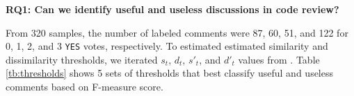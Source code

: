 %
%
%
%
%
%
%


\noindent \textbf{RQ1: Can we identify useful and useless discussions in code review?}

From 320 samples, the number of labeled comments were 87, 60, 51, and 122 for 0, 1, 2, and 3 \texttt{YES} votes, respectively.
To estimated estimated similarity and dissimilarity thresholds, we iterated $s_t$, $d_t$, $s'_t$, and $d'_t$ values from .  Table \ref{tb:thresholds} shows 5 sets of thresholds that best classify useful and useless comments based on F-measure score.   

